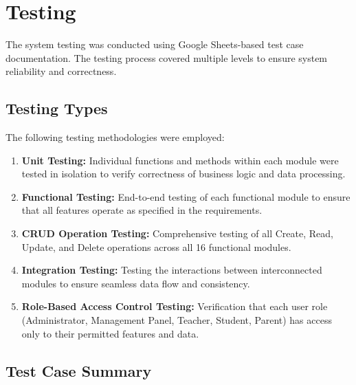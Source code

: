 \documentclass[12pt, a4paper]{report}
\begin{document}
\chapter{Testing}

The system testing was conducted using Google Sheets-based test case documentation. The testing process covered multiple levels to ensure system reliability and correctness.

\section{Testing Types}

The following testing methodologies were employed:

\begin{enumerate}
    \item \textbf{Unit Testing:} Individual functions and methods within each module were tested in isolation to verify correctness of business logic and data processing.
    \item \textbf{Functional Testing:} End-to-end testing of each functional module to ensure that all features operate as specified in the requirements.
    \item \textbf{CRUD Operation Testing:} Comprehensive testing of all Create, Read, Update, and Delete operations across all 16 functional modules.
    \item \textbf{Integration Testing:} Testing the interactions between interconnected modules to ensure seamless data flow and consistency.
    \item \textbf{Role-Based Access Control Testing:} Verification that each user role (Administrator, Management Panel, Teacher, Student, Parent) has access only to their permitted features and data.
\end{enumerate}

\section{Test Case Summary}
\end{document}
